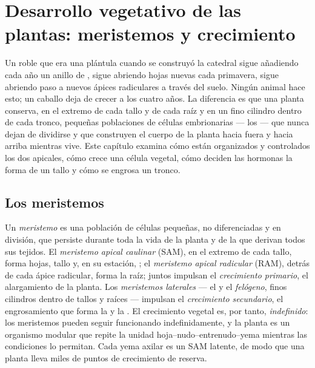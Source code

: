 \chapter{Desarrollo vegetativo de las plantas: meristemos y crecimiento}\label{ch:b2:plant-meristems}

Un roble que era una plántula cuando se construyó la catedral sigue
añadiendo cada año un anillo de , sigue abriendo hojas nuevas cada
primavera, sigue abriendo paso a nuevos ápices radiculares a través del
suelo. Ningún animal hace esto; un caballo deja de crecer a los cuatro
años. La diferencia es que una planta conserva, en el extremo de cada
tallo y de cada raíz y en un fino cilindro dentro de cada tronco, pequeñas
poblaciones de células embrionarias --- los \emph{} --- que
nunca dejan de dividirse y que construyen el cuerpo de la planta hacia
fuera y hacia arriba mientras vive. Este capítulo examina cómo están
organizados y controlados los dos  apicales, cómo crece una
célula vegetal, cómo deciden las hormonas la forma de un tallo y cómo se
engrosa un tronco.

\section{Los meristemos}

\begin{definition}\label{def:b2:plant-meristems:meristem}
Un \emph{meristemo} es una población de células pequeñas, no
diferenciadas y en división, que persiste durante toda la vida de la
planta y de la que derivan todos sus tejidos. El \emph{meristemo apical
caulinar} (SAM), en el extremo de cada tallo, forma hojas, tallo y, en su
estación, ; el \emph{meristemo apical radicular} (RAM), detrás de
cada ápice radicular, forma la raíz; juntos impulsan el
\emph{crecimiento primario}, el alargamiento de la planta. Los
\emph{meristemos laterales} --- el \emph{} y el
\emph{felógeno}, finos cilindros dentro de tallos y raíces --- impulsan el
\emph{crecimiento secundario}, el engrosamiento que forma la  y la
. El crecimiento vegetal es, por tanto, \emph{indefinido}: los
meristemos pueden seguir funcionando indefinidamente, y la planta es un
organismo modular que repite la unidad hoja--nudo--entrenudo--yema
mientras las condiciones lo permitan. Cada yema axilar es un SAM latente,
de modo que una planta lleva miles de puntos de crecimiento de reserva.
\end{definition}

